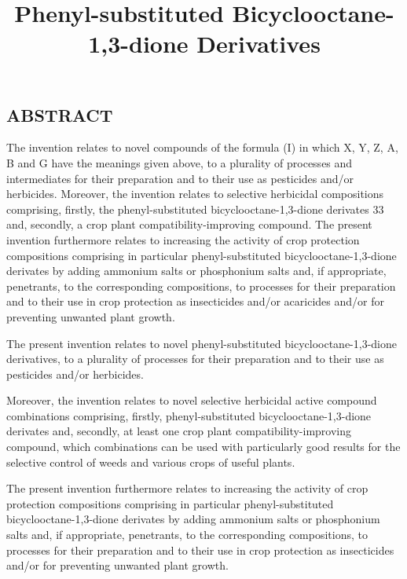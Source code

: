 \documentclass[11pt,a4paper]{article}
\title{Phenyl-substituted Bicyclooctane-1,3-dione Derivatives}
\begin{document}
\maketitle

\subsection{ABSTRACT}

The invention relates to novel compounds of the formula (I) in which X, Y, Z, A, B and G have the meanings given above, to a plurality of processes and intermediates for their preparation and to their use as pesticides and/or herbicides. Moreover, the invention relates to selective herbicidal compositions comprising, firstly, the phenyl-substituted bicyclooctane-1,3-dione derivates 33 and, secondly, a crop plant compatibility-improving compound. The present invention furthermore relates to increasing the activity of crop protection compositions comprising in particular phenyl-substituted bicyclooctane-1,3-dione derivates by adding ammonium salts or phosphonium salts and, if appropriate, penetrants, to the corresponding compositions, to processes for their preparation and to their use in crop protection as insecticides and/or acaricides and/or for preventing unwanted plant growth.

The present invention relates to novel phenyl-substituted bicyclooctane-1,3-dione derivatives, to a plurality of processes for their preparation and to their use as pesticides and/or herbicides.

Moreover, the invention relates to novel selective herbicidal active compound combinations comprising, firstly, phenyl-substituted bicyclooctane-1,3-dione derivates and, secondly, at least one crop plant compatibility-improving compound, which combinations can be used with particularly good results for the selective control of weeds and various crops of useful plants.

The present invention furthermore relates to increasing the activity of crop protection compositions comprising in particular phenyl-substituted bicyclooctane-1,3-dione derivates by adding ammonium salts or phosphonium salts and, if appropriate, penetrants, to the corresponding compositions, to processes for their preparation and to their use in crop protection as insecticides and/or for preventing unwanted plant growth.
\end{document}
